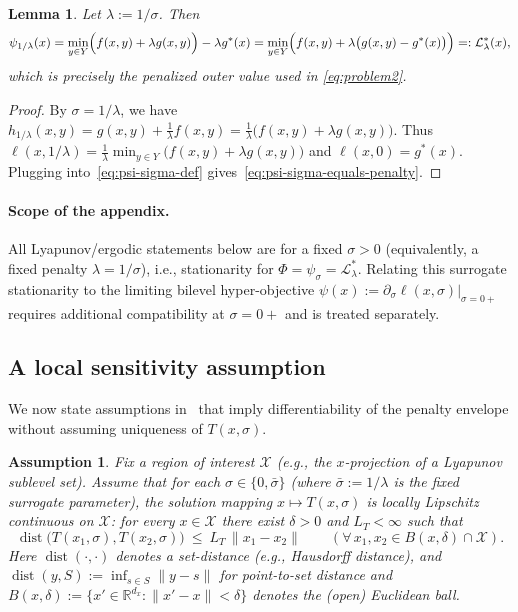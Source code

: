 \documentclass{article}
\newtheorem{lemma}[theorem]{Lemma}
\newtheorem{assumption}[theorem]{Assumption}
\newcommand{\1}{\mathbf{1}}
\begin{document}
\begin{lemma}\label{lem:psi-equals-Llambda}
Let $\lambda:=1/\sigma$. Then
\begin{equation}\label{eq:psi-sigma-equals-penalty}
\psi_{1/\lambda}(x)
=\min_{y\in Y}\Bigl(f(x,y)+\lambda g(x,y)\Bigr)-\lambda g^*(x)
=\min_{y\in Y}\Bigl(f(x,y)+\lambda\bigl(g(x,y)-g^*(x)\bigr)\Bigr)
=:\mathcal L_\lambda^*(x),
\end{equation}
which is precisely the penalized outer value used in \ref{eq:problem2}.
\end{lemma}

\begin{proof}
By $\sigma=1/\lambda$, we have $h_{1/\lambda}(x,y)=g(x,y)+\tfrac{1}{\lambda}f(x,y)=\tfrac{1}{\lambda}\bigl(f(x,y)+\lambda g(x,y)\bigr)$.
Thus $\ell(x,1/\lambda)=\tfrac{1}{\lambda}\min_{y\in Y}\bigl(f(x,y)+\lambda g(x,y)\bigr)$ and $\ell(x,0)=g^*(x)$.
Plugging into~\eqref{eq:psi-sigma-def} gives~\eqref{eq:psi-sigma-equals-penalty}.
\end{proof}

\paragraph{Scope of the appendix.}
All Lyapunov/ergodic statements below are for a fixed $\sigma>0$ (equivalently, a fixed penalty $\lambda=1/\sigma$),
i.e., stationarity for $\Phi=\psi_\sigma=\mathcal L_\lambda^*$.
Relating this surrogate stationarity to the limiting bilevel hyper-objective
$\psi(x):=\partial_\sigma \ell(x,\sigma)\vert_{\sigma=0+}$ requires additional compatibility at $\sigma=0+$ and is treated separately.

\subsection{A local sensitivity assumption}\label{app:nonunique-assumptions}
We now state assumptions in~\cite{kwon2023penalty} that imply differentiability of the penalty envelope
without assuming uniqueness of $T(x,\sigma)$.

\begin{assumption}\label{assump:SSC-nonunique}
Fix a region of interest $\mathcal X$ (e.g., the $x$-projection of a Lyapunov sublevel set).
Assume that for each $\sigma\in\{0,\bar\sigma\}$ (where $\bar\sigma:=1/\lambda$ is the fixed surrogate parameter),
the solution mapping $x\mapsto T(x,\sigma)$ is locally Lipschitz continuous on $\mathcal X$:
for every $x\in\mathcal X$ there exist $\delta>0$ and $L_T<\infty$ such that
\[
\operatorname{dist}\bigl(T(x_1,\sigma),T(x_2,\sigma)\bigr)\ \le\ L_T\,\|x_1-x_2\|
\qquad(\forall\,x_1,x_2\in B(x,\delta)\cap\mathcal X).
\]
Here $\operatorname{dist}(\cdot,\cdot)$ denotes a set-distance (e.g., Hausdorff distance), and $\operatorname{dist}(y,S):=\inf_{s\in S}\|y-s\|$ for point-to-set distance
and $B(x,\delta):=\{x'\in\mathbb R^{d_x}:\|x'-x\|<\delta\}$ denotes the (open) Euclidean ball.

\end{assumption}
\end{document}
